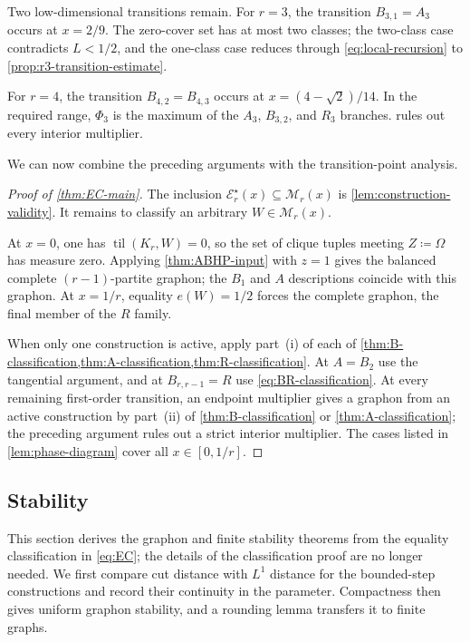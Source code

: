 \documentclass[10pt]{article}
\numberwithin{equation}{section}
\newcommand{\til}{\operatorname{til}}
\newcommand{\cE}{\mathcal E}
\newcommand{\cM}{\mathcal M}
\begin{document}
Two low-dimensional transitions remain.  For $r=3$, the transition $B_{3,1}=A_3$ occurs at $x=2/9$.  The zero-cover set has at most two classes; the two-class case contradicts $L<1/2$, and the one-class case reduces through \cref{eq:local-recursion} to \cref{prop:r3-transition-estimate}.

For $r=4$, the transition $B_{4,2}=B_{4,3}$ occurs at $x=(4-\sqrt2)/14$.  In the required range, $\Phi_3$ is the maximum of the $A_3$, $B_{3,2}$, and $R_3$ branches.   rules out every interior multiplier.

We can now combine the preceding arguments with the transition-point analysis.

\begin{proof}[Proof of \cref{thm:EC-main}]
The inclusion $\cE_r^\star(x)\subseteq\cM_r(x)$ is \cref{lem:construction-validity}.  It remains to classify an arbitrary $W\in\cM_r(x)$.

At $x=0$, one has $\til(K_r,W)=0$, so the set of clique tuples meeting $Z\coloneqq\Omega$ has measure zero.  Applying \cref{thm:ABHP-input} with $z=1$ gives the balanced complete $(r-1)$-partite graphon; the $B_1$ and $A$ descriptions coincide with this graphon.  At $x=1/r$, equality $e(W)=1/2$ forces the complete graphon, the final member of the $R$ family.

When only one construction is active, apply part~\textup{(i)} of each of \cref{thm:B-classification,thm:A-classification,thm:R-classification}.  At $A=B_2$ use the tangential argument, and at $B_{r,r-1}=R$ use \cref{eq:BR-classification}.  At every remaining first-order transition, an endpoint multiplier gives a graphon from an active construction by part~\textup{(ii)} of \cref{thm:B-classification} or \cref{thm:A-classification}; the preceding argument rules out a strict interior multiplier.  The cases listed in \cref{lem:phase-diagram} cover all $x\in[0,1/r]$.
\end{proof}

\subsection{Stability}\label{sec:formal-stability}

This section derives the graphon and finite stability theorems from the equality classification in \cref{eq:EC}; the details of the classification proof are no longer needed.  We first compare cut distance with $L^1$ distance for the bounded-step constructions and record their continuity in the parameter.  Compactness then gives uniform graphon stability, and a rounding lemma transfers it to finite graphs.
\end{document}
